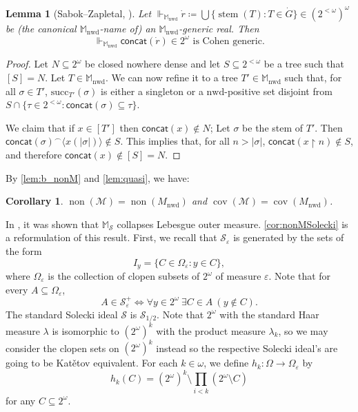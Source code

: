 \documentclass[a4paper,12pt]{amsart}
\newtheorem{lem}[thm]{Lemma}
\newtheorem{cor}[thm]{Corollary}
\theoremstyle{definition}
\numberwithin{thm}{section}
\numberwithin{equation}{section}
\DeclareMathOperator{\non}{non}
\DeclareMathOperator{\cov}{cov}
\newcommand{\forces}{\Vdash}
\DeclareMathOperator{\stem}{stem}
\newcommand{\nwd}{\mathrm{nwd}}
\renewcommand{\subset}{\subseteq}
\newcommand{\cantor}{2^{\omega}}
\newcommand{\cantortree}{2^{<\omega}}
\newcommand{\Solecki}{\mathcal{S}}
\newcommand{\cano}{(\cantortree)^\omega}
\begin{document}
    \begin{lem}[Sabok--Zapletal, \cite{SZ11}]\label{lem:bbmnwd_adds_Cohen}
         Let $\forces_{\mathbb{M}_{\nwd}}\dot{r}\coloneqq\bigcup\{\stem(T):T\in\dot{G}\}\in\cano$ be (the canonical $\mathbb{M}_{\nwd}$-name of) an $\mathbb{M}_{\nwd}$-generic real. Then
         \[
         \forces_{\mathbb{M}_{\nwd}} \mathsf{concat}(\dot{r})\in 2^\omega \text{ is Cohen generic.}
         \]
    \end{lem}
    \begin{proof}
         Let $N\subset 2^{\omega}$ be closed nowhere dense and let $S\subset 2^{<\omega}$ be a tree such that $[S] = N$.
         Let $T \in \mathbb{M}_{\nwd}$. We can now refine it to a tree $T' \in \mathbb{M}_\nwd$ such that, for all $\sigma \in T'$, $\mathrm{succ}_{T'}(\sigma)$ is either a singleton or a $\nwd$-positive set disjoint from $S\cap \{\tau \in 2^{<\omega} \colon \mathsf{concat}(\sigma) \subset \tau\}$.
         
         We claim that if $x \in [T']$ then $\mathsf{concat}(x) \notin N$; Let $\sigma$ be the stem of $T'$. Then $\mathsf{concat}(\sigma) ^\frown \langle x(\lvert\sigma\rvert)\rangle \notin S$. This implies that, for all $n > \lvert\sigma\rvert$, $\mathsf{concat}(x \restriction n) \notin S$, and therefore $\mathsf{concat}(x) \notin [S] = N$. 
    \end{proof}
    
    By \cref{lem:b_nonM} and \cref{lem:quasi}, we have:
    
    \begin{cor}\label{cor:Mnwd_nonm}
        $\non(\mathcal{M}) = \non(M_\nwd)$ and $\cov(\mathcal{M}) =\cov(M_\nwd)$.
    \end{cor}

    In \cite{SZ11}, it was shown that $\mathbb{M}_\Solecki$ collapses Lebesgue outer measure. \cref{cor:nonMSolecki} is a reformulation of this result. First, we recall that $\Solecki_\varepsilon$ is generated by the sets of the form 
    \[
    I_y = \{ C \in \Omega_{\varepsilon} \colon y \in C \},
    \]
    where $\Omega_\varepsilon$ is the collection of clopen subsets of $2^\omega$ of measure $\varepsilon$. Note that for every $A \subseteq \Omega_{\varepsilon}$,
    \[
    A\in \Solecki_\varepsilon^+ \iff \forall y \in 2^{\omega}~\exists C \in A~(y \notin C).
    \]
    The standard Solecki ideal $\Solecki$ is $\Solecki_{1/2}$. Note that $\cantor$ with the standard Haar measure $\lambda$ is isomorphic to $(2^\omega)^{k}$ with the product measure $\lambda_k$, so we may consider the clopen sets on $(2^\omega)^{k}$ instead so the respective Solecki ideal's are going to be Kat\v{e}tov equivalent. For each $k \in \omega$, we define $h_k\colon\Omega\to\Omega_\varepsilon$ by 
    \[
    h_k(C) = (2^\omega)^{k} \setminus \prod_{i<k} (2^\omega \setminus C)
    \]
    for any $C\subset 2^\omega$.
\end{document}
